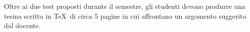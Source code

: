 \testi


\bib
{}
\endbib

\bib
{}
\endbib

\bib
{}
\endbib

\esami

Oltre ai due test proposti durante il semestre, gli studenti
devono produrre una tesina scritta in \TeX\ di circa 5 pagine
in cui affrontano un argomento suggerito dal docente.
\bye






